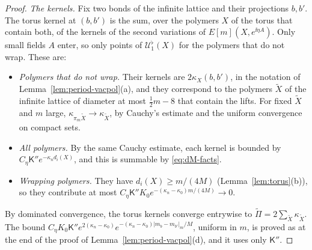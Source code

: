 \begin{proof}
\emph{The kernels.} Fix two bonds of the infinite lattice and their projections $b,b'$. The torus kernel at $(b,b')$ is the sum, over the polymers $X$ of the torus that contain both, of the kernels of the second variations of $E[m](X,e^{\ii\eta A})$. Only small fields $A$ enter, so only points of $\mathcal U^\flat_1(X)$ for the polymers that do not wrap. These are:
\begin{itemize}
\item \emph{Polymers that do not wrap.} Their kernels are $2\kappa_X(b,b')$, in the notation of Lemma~\ref{lem:period-vacpol}(a), and they correspond to the polymers $\tilde X$ of the infinite lattice of diameter at most $\frac12m-8$ that contain the lifts. For fixed $\tilde X$ and $m$ large, $\kappa_{\pi_m\tilde X}\to\kappa_{\tilde X}$, by Cauchy's estimate and the uniform convergence on compact sets.
\item \emph{All polymers.} By the same Cauchy estimate, each kernel is bounded by $C_\eta\mathsf K''e^{-\kappa_nd_i(X)}$, and this is summable by \eqref{eq:dM-facts}.
\item \emph{Wrapping polymers.} They have $d_i(X)\ge m/(4M)$ (Lemma~\ref{lem:torus}(b)), so they contribute at most $C_\eta\mathsf K''K_0e^{-(\kappa_n-\kappa_0)m/(4M)}\to0$.
\end{itemize}
By dominated convergence, the torus kernels converge entrywise to $\widetilde\Pi=2\sum_{\tilde X}\kappa_{\tilde X}$. The bound $C_\eta K_0\mathsf K''e^{2(\kappa_n-\kappa_0)}e^{-(\kappa_n-\kappa_0)|m_b-m_{b'}|_m/M}$, uniform in $m$, is proved as at the end of the proof of Lemma~\ref{lem:period-vacpol}(d), and it uses only $\mathsf K''$.
\end{proof}

